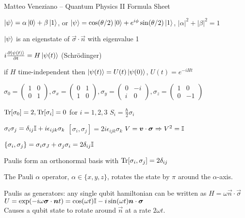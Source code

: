 Matteo Veneziano -- Quantum Physics II Formula Sheet

\begin{squishlist}
    \item $\ket{\psi} = \alpha \ket{0} + \beta \ket{1}$, or $\ket{\psi} = \cos(\theta/2)\ket{0} + e^{i\phi} \sin(\theta/2)\ket{1}$, $|\alpha|^2 + |\beta|^2 = 1$
    \item $\ket{\psi}$ is an eigenstate of $\vec{\sigma}\cdot \vec{n}$ with eigenvalue 1
\end{squishlist}

\begin{squishlist}
    \item $i \D{t}{\ket{\psi(t)}} = H \ket{\psi(t)}$ (Schrödinger)
    \item if $H$ time-independent then $\ket{\psi(t)} = U(t) \ket{\psi(0)}$, $U(t) = e^{-iHt}$
\end{squishlist}

\begin{squishlist}
    \item $\sigma_0 = \begin{pmatrix} 1 & 0\\ 0 & 1 \end{pmatrix},
        \sigma_x = \begin{pmatrix} 0 & 1 \\ 1 & 0 \end{pmatrix}, 
        \sigma_y=\begin{pmatrix} 0 & -i\\ i & 0\end{pmatrix} , 
        \sigma_z = \begin{pmatrix} 1 & 0 \\ 0 & -1\end{pmatrix}$

    \item $\Tr[\sigma_0] = 2, \Tr[\sigma_i] = 0$ for $i=1,2,3$ \hfill $S_i = \frac{\hbar}{2} \sigma_i$
    \item $\sigma_i \sigma_j = \delta_{ij} \id + i \epsilon_{ijk} \sigma_k$ \quad $[\sigma_i, \sigma_j] = 2i \epsilon_{ijk} \sigma_k$ \squishsep $V = \vec{v}\cdot \vec{\sigma} \Rightarrow V^2 = \id$
    \item $\{\sigma_i, \sigma_j \} = \sigma_i \sigma_J + \sigma_j\sigma_i = 2 \delta_{ij} \id$
    \item Paulis form an orthonormal basis with $\Tr[\sigma_i,\sigma_j] = 2\delta_{ij}$
    \item The Pauli $\alpha$ operator, $\alpha \in \{x,y,z\}$, rotates the state by $\pi$ around the $\alpha$-axis.

    \item Paulis as generators: any single qubit hamiltonian can be written as $H = \omega \vec{n}\cdot \vec{\sigma}$ \\
        $U = \exp(-i\omega \vec{\sigma}\cdot \vec{n} t) = \cos(\omega t) \id - i \sin(\omega t) \vec{n}\cdot\vec{\sigma}$ \\
        Causes a qubit state to rotate around $\vec{n}$ at a rate $2\omega t$.
\end{squishlist}

